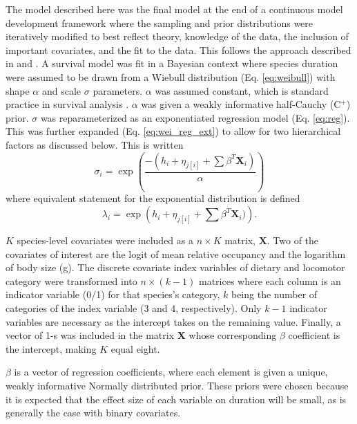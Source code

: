 \documentclass{article}
\begin{document}
The model described here was the final model at the end of a continuous model development framework where the sampling and prior distributions were iteratively modified to best reflect theory, knowledge of the data, the inclusion of important covariates, and the fit to the data. This follows the approach described in \cite{Gelman2007} and \cite{Gelman2013d}.
A survival model was fit in a Bayesian context where species duration were assumed to be drawn from a Wiebull distribution (Eq. \ref{eq:weibull}) with shape \(\alpha\) and scale \(\sigma\) parameters. \(\alpha\) was assumed constant, which is standard practice in survival analysis \cite{Klein2003}. \(\alpha\) was given a weakly informative half-Cauchy (C\(^{+}\)) prior. \(\sigma\) was reparameterized as an exponentiated regression model (Eq. \ref{eq:reg}). This was further expanded (Eq. \ref{eq:wei_reg_ext}) to allow for two hierarchical factors as discussed below. This is written
\begin{equation}
  \sigma_{i} = \exp\left(\frac{-(h_{i} + \eta_{j[i]} + \sum \beta^{T} \mathbf{X}_{i})}{\alpha}\right)
  \label{eq:wei_reg_ext}
\end{equation}
where equivalent statement for the exponential distribution is defined
\begin{equation}
  \lambda_{i} = \exp\left(h_{i} + \eta_{j[i]} + \sum \beta^{T} \mathbf{X}_{i})\right).
  \label{eq:exp_reg_ext}
\end{equation}

\(K\) species-level covariates were included as a \(n \times K\) matrix, \(\mathbf{X}\). Two of the covariates of interest are the logit of mean relative occupancy and the logarithm of body size (g). The discrete covariate index variables of dietary and locomotor category were transformed into \(n \times (k - 1)\) matrices where each column is an indicator variable (0/1) for that species's category, \(k\) being the number of categories of the index variable (3 and 4, respectively). Only \(k - 1\) indicator variables are necessary as the intercept takes on the remaining value. Finally, a vector of 1-s was included in the matrix \(\mathbf{X}\) whose corresponding \(\beta\) coefficient is the intercept, making \(K\) equal eight.

\(\beta\) is a vector of regression coefficients, where each element is given a unique, weakly informative Normally distributed prior. These priors were chosen because it is expected that the effect size of each variable on duration will be small, as is generally the case with binary covariates. %
\end{document}
